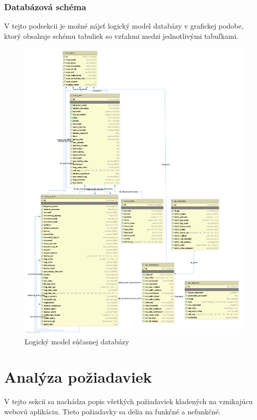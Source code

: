 \pagebreak 
\subsubsection{Databázová schéma}\label{schema-tabuliek}

V tejto podsekcii je možné nájsť logický model databázy v grafickej podobe, ktorý obsahuje schému tabuliek so vzťahmi medzi jednotlivými tabuľkami.

\begin{figure}[H]
	\includegraphics[width=1.0\textwidth]{media/analyza/diagram.png}
	\caption{Logický model súčasnej databázy}
\end{figure}

\section{Analýza požiadaviek}
V tejto sekcii sa nachádza popis všetkých požiadaviek kladených na vznikajúcu webovú aplikáciu.
Tieto požiadavky sa delia na funkčné a nefunkčné.

